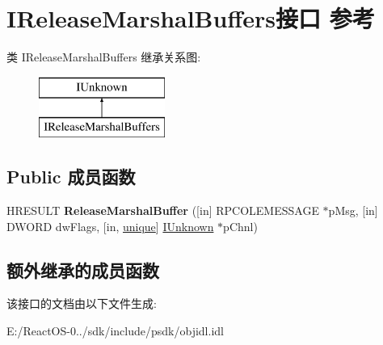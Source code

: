 \hypertarget{interface_i_release_marshal_buffers}{}\section{I\+Release\+Marshal\+Buffers接口 参考}
\label{interface_i_release_marshal_buffers}
类 I\+Release\+Marshal\+Buffers 继承关系图\+:\begin{figure}[H]
\begin{center}
\leavevmode
\includegraphics[height=2.000000cm]{interface_i_release_marshal_buffers}
\end{center}
\end{figure}
\subsection*{Public 成员函数}
\begin{DoxyCompactItemize}
\item 
\mbox{\label{interface_i_release_marshal_buffers_a7d7c2b0de28208c1e010d724f743c659}} 
H\+R\+E\+S\+U\+LT {\bfseries Release\+Marshal\+Buffer} (\mbox{[}in\mbox{]} R\+P\+C\+O\+L\+E\+M\+E\+S\+S\+A\+GE $\ast$p\+Msg, \mbox{[}in\mbox{]} D\+W\+O\+RD dw\+Flags, \mbox{[}in, \hyperlink{interfaceunique}{unique}\mbox{]} \hyperlink{interface_i_unknown}{I\+Unknown} $\ast$p\+Chnl)
\end{DoxyCompactItemize}
\subsection*{额外继承的成员函数}


该接口的文档由以下文件生成\+:\begin{DoxyCompactItemize}
\item 
E\+:/\+React\+O\+S-\/0../sdk/include/psdk/objidl.\+idl\end{DoxyCompactItemize}
